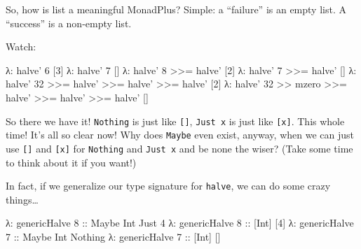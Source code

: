 \documentclass[]{article}
\newenvironment{Shaded}{}{}
\newcommand{\KeywordTok}[1]{\textcolor[rgb]{0.00,0.44,0.13}{\textbf{{#1}}}}
\newcommand{\DataTypeTok}[1]{\textcolor[rgb]{0.56,0.13,0.00}{{#1}}}
\newcommand{\DecValTok}[1]{\textcolor[rgb]{0.25,0.63,0.44}{{#1}}}
\newcommand{\OtherTok}[1]{\textcolor[rgb]{0.00,0.44,0.13}{{#1}}}
\newcommand{\FunctionTok}[1]{\textcolor[rgb]{0.02,0.16,0.49}{{#1}}}
\newcommand{\NormalTok}[1]{{#1}}
\begin{document}
So, how is list a meaningful MonadPlus? Simple: a ``failure'' is an
empty list. A ``success'' is a non-empty list.

Watch:

\begin{Shaded}
\begin{Highlighting}[]
\NormalTok{λ}\FunctionTok{:} \NormalTok{halve' }\DecValTok{6}
\NormalTok{[}\DecValTok{3}\NormalTok{]}
\NormalTok{λ}\FunctionTok{:} \NormalTok{halve' }\DecValTok{7}
\NormalTok{[]}
\NormalTok{λ}\FunctionTok{:} \NormalTok{halve' }\DecValTok{8} \FunctionTok{>>=} \NormalTok{halve'}
\NormalTok{[}\DecValTok{2}\NormalTok{]}
\NormalTok{λ}\FunctionTok{:} \NormalTok{halve' }\DecValTok{7} \FunctionTok{>>=} \NormalTok{halve'}
\NormalTok{[]}
\NormalTok{λ}\FunctionTok{:} \NormalTok{halve' }\DecValTok{32} \FunctionTok{>>=} \NormalTok{halve' }\FunctionTok{>>=} \NormalTok{halve' }\FunctionTok{>>=} \NormalTok{halve'}
\NormalTok{[}\DecValTok{2}\NormalTok{]}
\NormalTok{λ}\FunctionTok{:} \NormalTok{halve' }\DecValTok{32} \FunctionTok{>>} \NormalTok{mzero }\FunctionTok{>>=} \NormalTok{halve' }\FunctionTok{>>=} \NormalTok{halve' }\FunctionTok{>>=} \NormalTok{halve'}
\NormalTok{[]}
\end{Highlighting}
\end{Shaded}

So there we have it! \texttt{Nothing} is just like \texttt{{[}{]}},
\texttt{Just\ x} is just like \texttt{{[}x{]}}. This whole time! It's
all so clear now! Why does \texttt{Maybe} even exist, anyway, when we
can just use \texttt{{[}{]}} and \texttt{{[}x{]}} for \texttt{Nothing}
and \texttt{Just\ x} and be none the wiser? (Take some time to think
about it if you want!)

In fact, if we generalize our type signature for \texttt{halve}, we can
do some crazy things\ldots{}

\begin{Shaded}
\end{Shaded}

\begin{Shaded}
\begin{Highlighting}[]
\NormalTok{λ}\FunctionTok{:} \NormalTok{genericHalve }\DecValTok{8}\OtherTok{ ::} \DataTypeTok{Maybe} \DataTypeTok{Int}
\DataTypeTok{Just} \DecValTok{4}
\NormalTok{λ}\FunctionTok{:} \NormalTok{genericHalve }\DecValTok{8}\OtherTok{ ::} \NormalTok{[}\DataTypeTok{Int}\NormalTok{]}
\NormalTok{[}\DecValTok{4}\NormalTok{]}
\NormalTok{λ}\FunctionTok{:} \NormalTok{genericHalve }\DecValTok{7}\OtherTok{ ::} \DataTypeTok{Maybe} \DataTypeTok{Int}
\DataTypeTok{Nothing}
\NormalTok{λ}\FunctionTok{:} \NormalTok{genericHalve }\DecValTok{7}\OtherTok{ ::} \NormalTok{[}\DataTypeTok{Int}\NormalTok{]}
\NormalTok{[]}
\end{Highlighting}
\end{Shaded}
\end{document}
